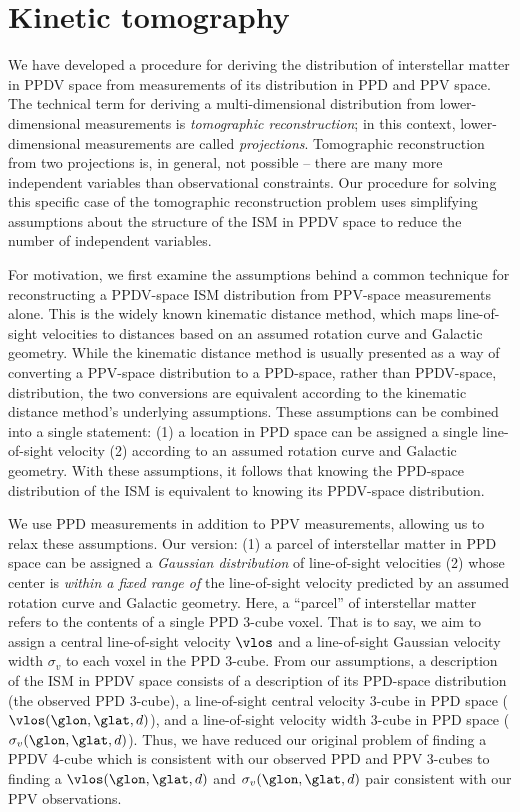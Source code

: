 \section{Kinetic tomography}
\label{sec:KT}
We have developed a procedure for deriving the distribution of interstellar matter in PPDV space from measurements of its distribution in PPD and PPV space. 
The technical term for deriving a multi-dimensional distribution from lower-dimensional measurements is \emph{tomographic reconstruction}; in this context, lower-dimensional measurements are called \emph{projections}. 
Tomographic reconstruction from two projections is, in general, not possible -- there are many more independent variables than observational constraints. 
Our procedure for solving this specific case of the tomographic reconstruction problem uses simplifying assumptions about the structure of the ISM in PPDV space to reduce the number of independent variables.

For motivation, we first examine the assumptions behind a common technique for reconstructing a PPDV-space ISM distribution from PPV-space measurements alone. 
This is the widely known kinematic distance method, which maps line-of-sight velocities to distances based on an assumed rotation curve and Galactic geometry. 
While the kinematic distance method is usually presented as a way of converting a PPV-space distribution to a PPD-space, rather than PPDV-space, distribution, the two conversions are equivalent according to the kinematic distance method's underlying assumptions.
These assumptions can be combined into a single statement: (1) a location in PPD space can be assigned a single line-of-sight velocity (2) according to an assumed rotation curve and Galactic geometry. 
With these assumptions, it follows that knowing the PPD-space distribution of the ISM is equivalent to knowing its PPDV-space distribution. 

We use PPD measurements in addition to PPV measurements, allowing us to relax these assumptions. 
Our version: (1) a parcel of interstellar matter in PPD space can be assigned a \emph{Gaussian distribution} of line-of-sight velocities (2) whose center is \emph{within a fixed range of} the line-of-sight velocity predicted by an assumed rotation curve and Galactic geometry. 
Here, a ``parcel'' of interstellar matter refers to the contents of a single PPD 3-cube voxel. 
That is to say, we aim to assign a central line-of-sight velocity $\vlos$ and a line-of-sight Gaussian velocity width $\sigma_v$ to each voxel in the PPD 3-cube. 
From our assumptions, a description of the ISM in PPDV space consists of a description of its PPD-space distribution (the observed PPD 3-cube), a line-of-sight central velocity 3-cube in PPD space ($\vlos(\glon, \glat, d)$), and a line-of-sight velocity width 3-cube in PPD space ($\sigma_v (\glon, \glat, d)$). 
Thus, we have reduced our original problem of finding a PPDV 4-cube which is consistent with our observed PPD and PPV 3-cubes to finding a $\vlos(\glon, \glat, d)$ and $\sigma_v(\glon, \glat, d)$ pair consistent with our PPV observations.


